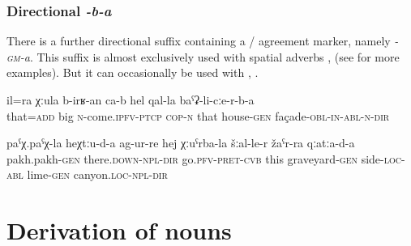 
\subsubsection{Directional \textit{-b-a}}
\label{sssec:Directional -gm-a}

There is a further directional suffix containing a / agreement marker, namely \textit{-\textsc{gm}-a}. This suffix is almost exclusively used with spatial adverbs ,  (see  for more examples). But it can occasionally be used with  , .
%
\begin{exe}
	\ex	\label{This is also growing along the façade of the house}
	\gll	il=ra	χːula	b-irʁ-an ca-b	hel	qal-la	baˁʡ-li-cːe-r-b-a\\
		that=\textsc{add}	big	\textsc{n}-come.\textsc{ipfv}-\textsc{ptcp} \textsc{cop-n}	that	house-\textsc{gen}	façade-\textsc{obl-in}-\textsc{abl}-\textsc{n}-\textsc{dir}\\
	\glt	{}
	
	\ex	\label{They went in the direction of pakh-pakh (microtoponym), across the side of the graveyard,}
	\gll	paˁχ.paˁχ-la	heχtːu-d-a	ag-ur-re	hej	χːuˁrba-la	šːal-le-r žaˁr-ra	qːatːa-d-a \\
		pakh.pakh-\textsc{gen}	there.\textsc{down-npl}-\textsc{dir}	go.\textsc{pfv}-\textsc{pret}-\textsc{cvb}	this	graveyard-\textsc{gen}	side-\textsc{loc}-\textsc{abl}	lime-\textsc{gen}	canyon.\textsc{loc}-\textsc{npl}-\textsc{dir}\\
	\glt	{}
\end{exe}



\section{Derivation of nouns}
\label{sec:nounderivation}


